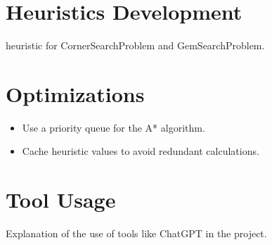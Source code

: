 \documentclass{article}
\begin{document}
\section{Heuristics Development}
    heuristic for CornerSearchProblem and GemSearchProblem.

\section{Optimizations}
\begin{itemize}
    \item Use a priority queue for the A* algorithm.
    \item Cache heuristic values to avoid redundant calculations.
\end{itemize}

\section{Tool Usage}
Explanation of the use of tools like ChatGPT in the project.
\end{document}
